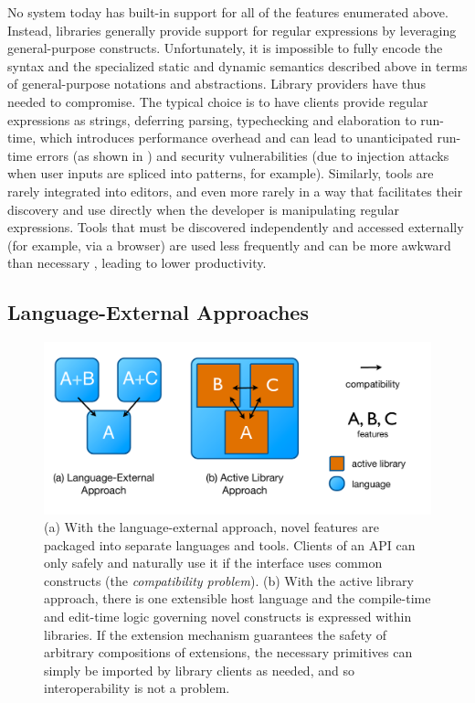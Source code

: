 No system today has built-in support for all of the features enumerated above. Instead, libraries generally provide support for regular expressions by leveraging  general-purpose constructs. Unfortunately, it is impossible to fully encode the syntax and the specialized static and dynamic semantics described above in terms of general-purpose notations and abstractions. Library providers have thus needed to compromise. The typical choice is to have clients provide regular expressions as strings, deferring parsing, typechecking and elaboration to run-time, which introduces performance overhead and can lead to unanticipated run-time errors (as shown in \cite{spishak2012type}) and security vulnerabilities (due to injection attacks when user inputs are spliced into patterns, for example). Similarly, tools are rarely integrated into editors, and even more rarely in a way that facilitates their discovery and use directly when the developer is manipulating regular expressions. Tools that must be discovered independently and accessed externally (for example, via a browser) are used less frequently  and can be more awkward than necessary \cite{Campbell:2008:DRT:1636642.1636651, Omar:2012:ACC:2337223.2337324}, leading to lower productivity.

\subsection{Language-External Approaches}
\begin{figure}
\begin{center}
\includegraphics[scale=0.45]{approaches.pdf}
\end{center}
\vspace{-20px}
\caption{\small (a) With the language-external approach, novel features are packaged into separate languages and tools. Clients of an API can only safely and naturally use it if the interface uses common constructs (the \emph{compatibility problem}). (b) With the active library approach, there is one extensible host language and the compile-time and edit-time logic governing novel constructs is expressed within libraries. If the extension mechanism guarantees the safety of arbitrary compositions of extensions, the necessary primitives can simply be imported by library clients as needed, and so interoperability is not a problem.}
\label{approaches}
\end{figure}


